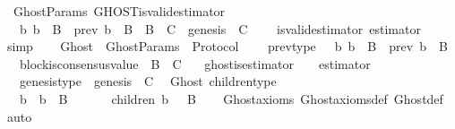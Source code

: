 \begin{isabellebody}
\isanewline
\isanewline
{}\isamarkupfalse%
\ {\isacharparenleft}\ GhostParams{\isacharparenright}\ GHOST{\isacharunderscore}is{\isacharunderscore}valid{\isacharunderscore}estimator\ {\isacharcolon}\ \isanewline
\ \ {\isachardoublequoteopen}{\isacharparenleft}{\isasymforall}\ b{\isachardot}\ b\ {\isasymin}\ B\ {\isasymlongleftrightarrow}\ prev\ b\ {\isasymin}\ B{\isacharparenright}\ {\isasymand}\ B\ {\isacharequal}\ C\ {\isasymand}\ genesis\ {\isasymin}\ C\ \isanewline
\ \ {\isasymLongrightarrow}\ is{\isacharunderscore}valid{\isacharunderscore}estimator\ estimator{\isachardoublequoteclose}\isanewline
%
\isadelimproof
\ \ %
\endisadelimproof
%
\isatagproof
{}\isamarkupfalse%
\ simp\isanewline
\ \ \isamarkupfalse%
%
\endisatagproof
{\isafoldproof}%
%
\isadelimproof
\isanewline
%
\endisadelimproof
\isanewline
\isanewline
{}\isamarkupfalse%
\ Ghost\ {\isacharequal}\ GhostParams\ {\isacharplus}\ Protocol\ {\isacharplus}\isanewline
\ \ \ prev{\isacharunderscore}type\ {\isacharcolon}\ {\isachardoublequoteopen}{\isasymforall}\ b{\isachardot}\ b\ {\isasymin}\ B\ {\isasymlongleftrightarrow}\ prev\ b\ {\isasymin}\ B{\isachardoublequoteclose}\isanewline
\ \ \ block{\isacharunderscore}is{\isacharunderscore}consensus{\isacharunderscore}value\ {\isacharcolon}\ {\isachardoublequoteopen}B\ {\isacharequal}\ C{\isachardoublequoteclose}\isanewline
\ \ \ ghost{\isacharunderscore}is{\isacharunderscore}estimator\ {\isacharcolon}\ {\isachardoublequoteopen}{\isasymepsilon}\ {\isacharequal}\ estimator{\isachardoublequoteclose}\isanewline
\ \ \ genesis{\isacharunderscore}type\ {\isacharcolon}\ {\isachardoublequoteopen}genesis\ {\isasymin}\ C{\isachardoublequoteclose}\isanewline
\isanewline
{}\isamarkupfalse%
\ {\isacharparenleft}\ Ghost{\isacharparenright}\ children{\isacharunderscore}type\ {\isacharcolon}\isanewline
\ \ {\isachardoublequoteopen}{\isasymforall}\ b\ {\isasymsigma}{\isachardot}\ b\ {\isasymin}\ B\ {\isasymand}\ {\isasymsigma}\ {\isasymin}\ {\isasymSigma}\ {\isasymlongrightarrow}\ \ children\ {\isacharparenleft}b{\isacharcomma}\ {\isasymsigma}{\isacharparenright}\ {\isasymsubseteq}\ B{\isachardoublequoteclose}\isanewline
%
\isadelimproof
\ \ %
\endisadelimproof
%
\isatagproof
{}\isamarkupfalse%
\ Ghost{\isacharunderscore}axioms\ Ghost{\isacharunderscore}axioms{\isacharunderscore}def\ Ghost{\isacharunderscore}def\ \isamarkupfalse%
\ auto%
\endisatagproof
{\isafoldproof}%

\end{isabellebody}

